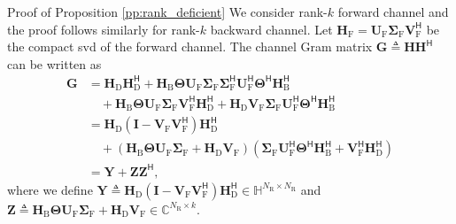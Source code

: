 \begin{appendix}
\begin{subsection}{Proof of Proposition \ref{pp:rank_deficient}}\label{ap:rank_deficient}
	We consider rank-$k$ forward channel and the proof follows similarly for rank-$k$ backward channel.
	Let $\mathbf{H}_\mathrm{F} = \mathbf{U}_\mathrm{F} \mathbf{\Sigma}_\mathrm{F} \mathbf{V}_\mathrm{F}^\mathsf{H}$ be the compact \gls{svd} of the forward channel.
	The channel Gram matrix $\mathbf{G} \triangleq \mathbf{H} \mathbf{H}^\mathsf{H} $ can be written as
	\begin{equation*}
		\begin{split}
			\mathbf{G}
			 & = \mathbf{H}_\mathrm{D} \mathbf{H}_\mathrm{D}^\mathsf{H} + \mathbf{H}_\mathrm{B} \mathbf{\Theta} \mathbf{U}_\mathrm{F} \mathbf{\Sigma}_\mathrm{F} \mathbf{\Sigma}_\mathrm{F}^\mathsf{H} \mathbf{U}_\mathrm{F}^\mathsf{H} \mathbf{\Theta}^\mathsf{H} \mathbf{H}_\mathrm{B}^\mathsf{H}                                                         \\
			 & \quad + \mathbf{H}_\mathrm{B} \mathbf{\Theta} \mathbf{U}_\mathrm{F} \mathbf{\Sigma}_\mathrm{F} \mathbf{V}_\mathrm{F}^\mathsf{H} \mathbf{H}_\mathrm{D}^\mathsf{H} + \mathbf{H}_\mathrm{D} \mathbf{V}_\mathrm{F} \mathbf{\Sigma}_\mathrm{F} \mathbf{U}_\mathrm{F}^\mathsf{H} \mathbf{\Theta}^\mathsf{H} \mathbf{H}_\mathrm{B}^\mathsf{H}       \\
			 & = \mathbf{H}_\mathrm{D} (\mathbf{I} - \mathbf{V}_\mathrm{F} \mathbf{V}_\mathrm{F}^\mathsf{H}) \mathbf{H}_\mathrm{D}^\mathsf{H}                                                                                                                                                                                                               \\
			 & \quad + (\mathbf{H}_\mathrm{B} \mathbf{\Theta} \mathbf{U}_\mathrm{F} \mathbf{\Sigma}_\mathrm{F} + \mathbf{H}_\mathrm{D} \mathbf{V}_\mathrm{F}) (\mathbf{\Sigma}_\mathrm{F} \mathbf{U}_\mathrm{F}^\mathsf{H} \mathbf{\Theta}^\mathsf{H} \mathbf{H}_\mathrm{B}^\mathsf{H} + \mathbf{V}_\mathrm{F}^\mathsf{H} \mathbf{H}_\mathrm{D}^\mathsf{H}) \\
			 & = \mathbf{Y} + \mathbf{Z} \mathbf{Z}^\mathsf{H},
		\end{split}
	\end{equation*}
	where we define $\mathbf{Y} \triangleq \mathbf{H}_\mathrm{D} (\mathbf{I} - \mathbf{V}_\mathrm{F} \mathbf{V}_\mathrm{F}^\mathsf{H}) \mathbf{H}_\mathrm{D}^\mathsf{H} \in \mathbb{H}^{N_\mathrm{R} \times N_\mathrm{R}}$ and $\mathbf{Z} \triangleq \mathbf{H}_\mathrm{B} \mathbf{\Theta} \mathbf{U}_\mathrm{F} \mathbf{\Sigma}_\mathrm{F} + \mathbf{H}_\mathrm{D} \mathbf{V}_\mathrm{F} \in \mathbb{C}^{N_\mathrm{R} \times k}$.

\end{subsection}
\end{appendix}

